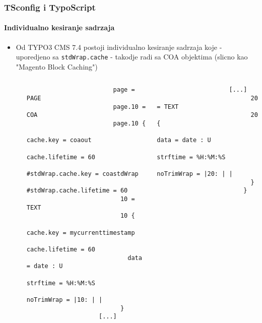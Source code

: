 \begin{frame}[fragile]
	\frametitle{TSconfig i TypoScript}
	\framesubtitle{Individualno kesiranje sadrzaja}

	\lstset{basicstyle=\tiny\ttfamily}

	\begin{itemize}

		\item Od TYPO3 CMS 7.4 postoji individualno kesiranje sadrzaja koje - uporedjeno sa \texttt{stdWrap.cache} -
			takodje radi sa COA objektima \newline(slicno kao "Magento Block Caching")

			\begin{columns}[T]
				\begin{column}{.07\textwidth}
                \end{column}
				\begin{column}{.465\textwidth}
					\begin{lstlisting}
						page = PAGE
						page.10 = COA
						page.10 {
						  cache.key = coaout
						  cache.lifetime = 60
						  #stdWrap.cache.key = coastdWrap
						  #stdWrap.cache.lifetime = 60
						  10 = TEXT
						  10 {
						    cache.key = mycurrenttimestamp
						    cache.lifetime = 60
						    data = date : U
						    strftime = %H:%M:%S
						    noTrimWrap = |10: | |
						  }
					[...]
					\end{lstlisting}
				\end{column}

				\begin{column}{.465\textwidth}
					\begin{lstlisting}
					[...]
						  20 = TEXT
						  20 {
						    data = date : U
						    strftime = %H:%M:%S
						    noTrimWrap = |20: | |
						  }
						}
					\end{lstlisting}

				\end{column}
			\end{columns}

	\end{itemize}

\end{frame}

